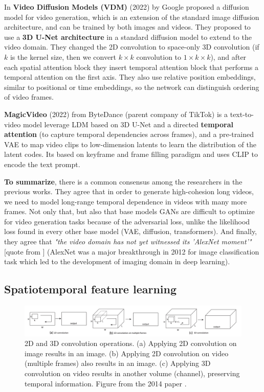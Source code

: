 In \textbf{Video Diffusion Models (VDM)} \cite{video_diffusion_models} (2022) by Google proposed a diffusion model for video generation, which is an extension of the standard image diffusion architecture, and can be trained by both images and videos. They proposed to use a \textbf{3D U-Net architecture} in a standard diffusion model to extend to the video domain. They changed the 2D convolution to space-only 3D convolution (if $k$ is the kernel size, then we convert $k\times k$ convolution to $1\times k\times k$), and after each spatial attention block they insert temporal attention block that performs a temporal attention on the first axis. They also use relative position embeddings, similar to positional or time embeddings, so the network can distinguish ordering of video frames.

\textbf{MagicVideo} (2022) \cite{magic_video} from ByteDance (parent company of TikTok) is a text-to-video model leverage LDM based on 3D U-Net and a directed \textbf{temporal attention} (to capture temporal dependencies across frames), and a pre-trained VAE to map video clips to low-dimension latents to learn the distribution of the latent codes. Its based on keyframe and frame filling paradigm and uses CLIP to encode the text prompt.

\textbf{To summarize}, there is a common consensus among the researchers in the previous works. They agree that in order to generate high-cohesion long videos, we need to model long-range temporal dependence in videos with many more frames. Not only that, but also that base models GANs are difficult to optimize for video generation tasks because of the adversarial loss, unlike the likelihood loss found in every other base model (VAE, diffusion, transformers). And finally, they agree that \textit{"the video domain has not yet witnessed its 'AlexNet moment'"} [quote from \cite{tran2018closer}] (AlexNet \cite{alexnet} was a major breakthrough in 2012 for image classification task which led to the development of imaging domain in deep learning). 






\subsection{Spatiotemporal feature learning}

\begin{figure}
    \centering
    \includegraphics[width=1\textwidth]{images/video_synthesis/conv.png}
    \caption{2D and 3D convolution operations. (a) Applying 2D convolution on image results in an image. (b) Applying 2D convolution on video (multiple frames) also results in an image. (c) Applying 3D convolution on video results in another volume (channel), preserving temporal information. Figure from the 2014 paper \cite{tran2015learning}.}
\end{figure}

